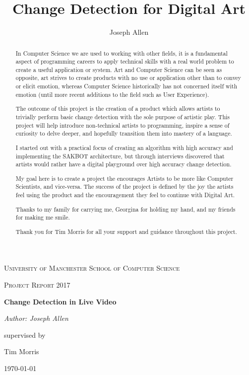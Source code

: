 \documentclass[a4paper]{report}
\title{Change Detection for Digital Art}
\author{Joseph Allen}
\begin{document}
\begin{titlepage}
	\centering
	{\scshape\LARGE University of Manchester School of Computer Science \par}
	\vspace{1cm}
	{\scshape\Large Project Report 2017\par}
	\vspace{1.5cm}
	{\huge\bfseries Change Detection in Live Video\par}
	\vspace{2cm}
	{\Large\itshape Author: Joseph Allen\par}
	supervised by\par
	Tim Morris

	\vfill

	{\large \today\par}
\end{titlepage}

\begin{abstract}
In Computer Science we are used to working with other fields, it is a fundamental aspect of programming careers to apply technical skills with a real world problem to create a useful application or system. Art and Computer Science can be seen as opposite, art strives to create products with no use or application other than to convey or elicit emotion, whereas Computer Science historically has not concerned itself with emotion (until more recent additions to the field such as User Experience). 

The outcome of this project is the creation of a product which allows artists to trivially perform basic change detection with the sole purpose of artistic play. This project will help introduce non-technical artists to programming, inspire a sense of curiosity to delve deeper, and hopefully transition them into mastery of a language.

I started out with a practical focus of creating an algorithm with high accuracy and implementing the SAKBOT architecture, but through interviews discovered that artists would rather have a digital playground over high accuracy change detection.

My goal here is to create a project the encourages Artists to be more like Computer Scientists, and vice-versa. The success of the project is defined by the joy the artists feel using the product and the encouragement they feel to continue with Digital Art.
\end{abstract}

\renewcommand{\abstractname}{Acknowledgements}
\begin{abstract}
Thanks to my family for carrying me, Georgina for holding my hand, and my friends for making me smile.

Thank you for Tim Morris for all your support and guidance throughout this project.
\end{abstract}
\end{document}
